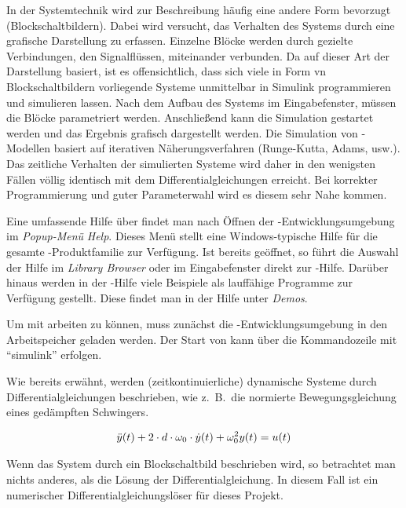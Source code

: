In der Systemtechnik wird zur Beschreibung häufig eine andere Form bevorzugt (Blockschaltbildern).
Dabei wird versucht, das Verhalten des Systems durch eine grafische Darstellung zu erfassen.
Einzelne Blöcke werden durch gezielte Verbindungen, den Signalflüssen, miteinander verbunden.
Da  auf dieser Art der Darstellung basiert, ist es offensichtlich, dass sich viele in Form vn Blockschaltbildern vorliegende Systeme unmittelbar in Simulink programmieren und simulieren lassen.
Nach dem Aufbau des Systems im Eingabefenster, müssen die Blöcke parametriert werden.
Anschließend kann die Simulation gestartet werden und das Ergebnis grafisch dargestellt werden.
Die Simulation von -Modellen basiert auf iterativen Näherungsverfahren (Runge-Kutta, Adams, usw.).
Das zeitliche Verhalten der simulierten Systeme wird daher in den wenigsten Fällen völlig identisch mit dem Differentialgleichungen erreicht.
Bei korrekter Programmierung und guter Parameterwahl wird es diesem sehr Nahe kommen.

Eine umfassende Hilfe über  findet man nach Öffnen der -Entwicklungsumgebung im \emph{Popup-Menü} \emph{Help}.
Dieses Menü stellt eine Windows-typische Hilfe für die gesamte -Produktfamilie zur Verfügung.
Ist  bereits geöffnet, so führt die Auswahl der Hilfe im \emph{Library Browser} oder im Eingabefenster direkt zur -Hilfe.
Darüber hinaus werden in der -Hilfe viele Beispiele als lauffähige Programme zur Verfügung gestellt.
Diese findet man in der Hilfe unter \emph{Demos}.

Um mit  arbeiten zu können, muss zunächst die -Entwicklungsumgebung in den Arbeitspeicher geladen werden.
Der Start von  kann über die Kommandozeile mit \enquote{simulink} erfolgen.

Wie bereits erwähnt, werden (zeitkontinuierliche) dynamische Systeme durch Differentialgleichungen beschrieben, wie z.\ B.\ die normierte Bewegungsgleichung eines gedämpften Schwingers.

\begin{align*}
	\ddot{y}(t) + 2\cdot d\cdot \omega_{\mathrm{0}}\cdot \dot{y}(t) + \omega_{\mathrm{0}}^{2} y(t) = u(t)
\end{align*}

Wenn das System durch ein Blockschaltbild beschrieben wird, so betrachtet man nichts anderes, als die Lösung der Differentialgleichung.
In diesem Fall ist  ein numerischer Differentialgleichungslöser für dieses Projekt.

